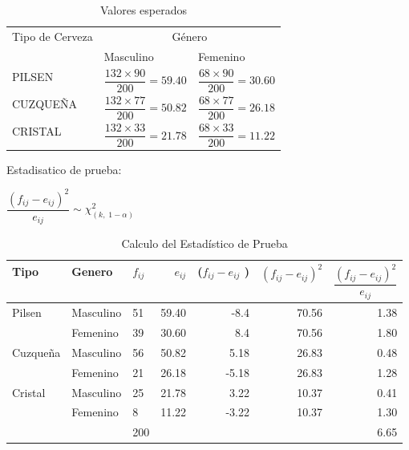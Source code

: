 \documentclass{article}
\begin{document}
\begin{table}[h]
\center
\begin{tabular}{|l|l|l|}
\hline
\multirow{2}{*}{Tipo de Cerveza} & \multicolumn{2}{c|}{Género} \\ \cline{2-3} 
                                 & Masculino     & Femenino    \\ \hline \hline
PILSEN                           & $\dfrac{132 \times 90}{200} = 59.40$ & $\dfrac{68 \times 90}{200} = 30.60$       \\ [1ex] \hline
CUZQUEÑA                         & $\dfrac{132 \times 77}{200} = 50.82$ & $\dfrac{68 \times 77}{200} = 26.18$       \\ [1ex] \hline
CRISTAL                          & $\dfrac{132 \times 33}{200} = 21.78$ & $\dfrac{68 \times 33}{200} = 11.22$       \\ [1ex] \hline
\end{tabular}
\caption{Valores esperados}
\end{table}


Estadisatico de prueba: 

$ \dfrac{(f_{ij}-e_{ij})^2}{e_{ij}} \sim \chi^2_{(k,\; 1-\alpha)}$

\newpage

\begin{table}[h!]
\centering
\begin{tabular}{ll|l|rrr|r|}
\hline
\multicolumn{1}{|l|}{Tipo} & Genero & $f_{ij}$ & \multicolumn{1}{r|}{$e_{ij}$} & \multicolumn{1}{r|}{($f_{ij} - e_{ij}$ )} & $ (f_{ij} - e_{ij})^2 $ & $\dfrac{(f_{ij}-e_{ij})^2}{e_{ij}}$ \\ [1ex] \hline \hline
\multicolumn{1}{|l|}{\multirow{2}{*}{Pilsen}} & Masculino & 51 & \multicolumn{1}{r|}{59.40} & \multicolumn{1}{r|}{-8.4} & 70.56 & 1.38 \\ \cline{2-7} 
\multicolumn{1}{|l|}{} & Femenino & 39 & \multicolumn{1}{r|}{30.60} & \multicolumn{1}{r|}{8.4} & 70.56 & 1.80 \\ \hline
\multicolumn{1}{|l|}{\multirow{2}{*}{Cuzqueña}} & Masculino & 56 & \multicolumn{1}{r|}{50.82} & \multicolumn{1}{r|}{5.18} & 26.83 & 0.48 \\ \cline{2-7} 
\multicolumn{1}{|l|}{} & Femenino & 21 & \multicolumn{1}{r|}{26.18} & \multicolumn{1}{r|}{-5.18} & 26.83 & 1.28 \\ \hline
\multicolumn{1}{|l|}{\multirow{2}{*}{Cristal}} & Masculino & 25 & \multicolumn{1}{r|}{21.78} & \multicolumn{1}{r|}{3.22} & 10.37 & 0.41 \\ \cline{2-7} 
\multicolumn{1}{|l|}{} & Femenino & 8 & \multicolumn{1}{r|}{11.22} & \multicolumn{1}{r|}{-3.22} & 10.37 & 1.30 \\ \hline
 &  & 200 &  &  &  & 6.65 \\ \cline{3-3} \cline{7-7} 
\end{tabular}
\caption{Calculo del Estadístico de Prueba}
\end{table}
\end{document}
